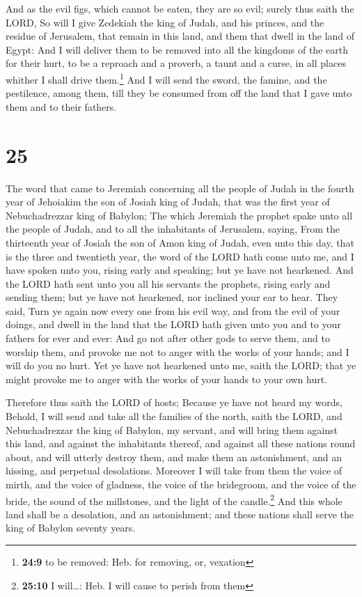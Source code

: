  And as the evil figs, which cannot be eaten, they are so
evil; surely thus saith the LORD, So will I give Zedekiah the king of
Judah, and his princes, and the residue of Jerusalem, that remain in
this land, and them that dwell in the land of Egypt:  And
I will deliver them to be removed into all the kingdoms of the earth for
their hurt, to be a reproach and a proverb, a taunt and a curse, in all
places whither I shall drive them.\footnote{\textbf{24:9} to be removed:
  Heb. for removing, or, vexation}  And I will send the
sword, the famine, and the pestilence, among them, till they be consumed
from off the land that I gave unto them and to their fathers.

\hypertarget{section-24}{%
\section{25}\label{section-24}}

 The word that came to Jeremiah concerning all the people
of Judah in the fourth year of Jehoiakim the son of Josiah king of
Judah, that was the first year of Nebuchadrezzar king of Babylon;
 The which Jeremiah the prophet spake unto all the people
of Judah, and to all the inhabitants of Jerusalem, saying,
 From the thirteenth year of Josiah the son of Amon king
of Judah, even unto this day, that is the three and twentieth year, the
word of the LORD hath come unto me, and I have spoken unto you, rising
early and speaking; but ye have not hearkened.  And the
LORD hath sent unto you all his servants the prophets, rising early and
sending them; but ye have not hearkened, nor inclined your ear to hear.
 They said, Turn ye again now every one from his evil way,
and from the evil of your doings, and dwell in the land that the LORD
hath given unto you and to your fathers for ever and ever:
 And go not after other gods to serve them, and to worship
them, and provoke me not to anger with the works of your hands; and I
will do you no hurt.  Yet ye have not hearkened unto me,
saith the LORD; that ye might provoke me to anger with the works of your
hands to your own hurt.

 Therefore thus saith the LORD of hosts; Because ye have
not heard my words,  Behold, I will send and take all the
families of the north, saith the LORD, and Nebuchadrezzar the king of
Babylon, my servant, and will bring them against this land, and against
the inhabitants thereof, and against all these nations round about, and
will utterly destroy them, and make them an astonishment, and an
hissing, and perpetual desolations.  Moreover I will take
from them the voice of mirth, and the voice of gladness, the voice of
the bridegroom, and the voice of the bride, the sound of the millstones,
and the light of the candle.\footnote{\textbf{25:10} I will\ldots: Heb.
  I will cause to perish from them}  And this whole land
shall be a desolation, and an astonishment; and these nations shall
serve the king of Babylon seventy years.


